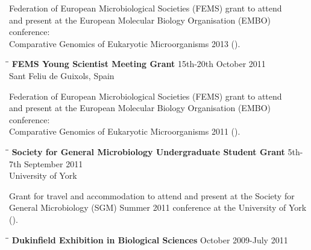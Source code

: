 \documentclass{res}
\begin{document}
\begin{resume}
   Federation of European Microbiological Societies (FEMS) grant to attend\\ and present at the European Molecular Biology Organisation (EMBO) conference:\\ Comparative Genomics of Eukaryotic Microorganisms 2013 ().

 
 \vspace{-0.1in}  
   \begin{tabbing}
   \hspace{2in}\= \hspace{2.6in}\= \kill 
    {\bf FEMS Young Scientist Meeting Grant} \> \> 15th-20th October 2011\\
                            \>  
                            \> Sant Feliu de Guixols, Spain \\
                       
   \end{tabbing}\vspace{-30pt}      

   Federation of European Microbiological Societies (FEMS) grant to attend\\ and present at the European Molecular Biology Organisation (EMBO) conference: \\ Comparative Genomics of Eukaryotic Microorganisms 2011 ().

 
\vspace{-0.1in}  
   \begin{tabbing}
   \hspace{2in}\= \hspace{2.6in}\= \kill
    {\bf Society for General Microbiology Undergraduate Student Grant} \> \> 5th-7th September 2011\\
                            \> 
                            \> University of York \\

   \end{tabbing}\vspace{-30pt}      
   Grant for travel and accommodation to attend and present at the Society for \\ General Microbiology (SGM) Summer 2011 conference at the University of York (). 

 
   \begin{tabbing}
   \hspace{2in}\= \hspace{2.6in}\= \kill 
    {\bf Dukinfield Exhibition in Biological Sciences} \> \>        October 2009-July 2011\\
                                               

\end{tabbing}
\end{resume}
\end{document}
